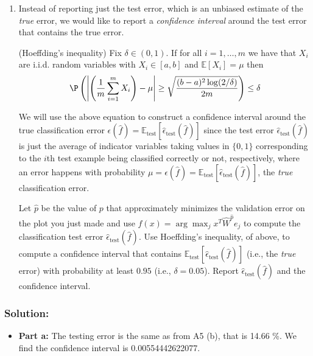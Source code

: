\documentclass[shortlabels]{article}
\begin{document}
\newpage
\begin{bprob}
    \begin{enumerate}

        \item {} Instead of reporting just the test error, which is an unbiased estimate of the \emph{true} error, we would like to report a \emph{confidence interval} around the test error that contains the true error.
        \begin{lemma}(Hoeffding's inequality)
            Fix $\delta \in (0,1)$. If for all $i=1,\dots,m$ we have that $X_i$ are i.i.d. random variables with $X_i \in [a,b]$ and $\mathbb{E}[X_i] = \mu$ then
            \begin{align*}
                \P\left( \left| \left(\frac{1}{m} \sum_{i=1}^m X_i\right) - \mu \right| \geq \sqrt{\frac{(b-a)^2\log(2/\delta)}{2m}} \right) \leq \delta
            \end{align*}
        \end{lemma}
        We will use the above equation to construct a confidence interval around the true classification error $\epsilon(\widehat{f})=\mathbb{E}_{\text{test}}[\widehat{\epsilon}_{\textrm{test}}(\widehat{f})]$ since the test error $\widehat{\epsilon}_{\textrm{test}}(\widehat{f})$ is just the average of indicator variables taking values in $\{0,1\}$ corresponding to the $i$th test example being classified correctly or not, respectively, where an error happens with probability $\mu=\epsilon(\widehat{f})=\mathbb{E}_{\text{test}}[\widehat{\epsilon}_{\textrm{test}}(\widehat{f})]$, the \emph{true} classification error. 
        
        Let $\widehat{p}$ be the value of $p$ that approximately minimizes the validation error on the plot you just made and use $\widehat{f}(x) = \arg\max_j x^T \widehat{W}^{\widehat{p}} e_j$ to compute the classification test error $\widehat{\epsilon}_{\textrm{test}}(\widehat{f})$. Use Hoeffding's inequality, of above, to compute a confidence interval that contains $\mathbb{E}_{\text{test}}[\widehat{\epsilon}_{\textrm{test}}(\widehat{f})]$ (i.e., the \emph{true} error) with probability at least $0.95$ (i.e., $\delta=0.05$). Report $\widehat{\epsilon}_{\textrm{test}}(\widehat{f})$ and the confidence interval. 
    \end{enumerate}
    
    \subsubsection*{Solution:}
    \begin{itemize}
        \item \textbf{Part a:} The testing error is the same as from A5 (b), that is 14.66 \%. We find the confidence interval is  0.00554442622077. 
        

\end{itemize}
\end{bprob}
\end{document}
